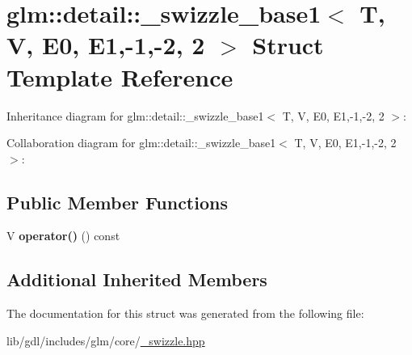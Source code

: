\hypertarget{structglm_1_1detail_1_1__swizzle__base1_3_01_t_00_01_v_00_01_e0_00_01_e1_00-1_00-2_00_012_01_4}{}\section{glm\+:\+:detail\+:\+:\+\_\+swizzle\+\_\+base1$<$ T, V, E0, E1,-\/1,-\/2, 2 $>$ Struct Template Reference}
\label{structglm_1_1detail_1_1__swizzle__base1_3_01_t_00_01_v_00_01_e0_00_01_e1_00-1_00-2_00_012_01_4}


Inheritance diagram for glm\+:\+:detail\+:\+:\+\_\+swizzle\+\_\+base1$<$ T, V, E0, E1,-\/1,-\/2, 2 $>$\+:


Collaboration diagram for glm\+:\+:detail\+:\+:\+\_\+swizzle\+\_\+base1$<$ T, V, E0, E1,-\/1,-\/2, 2 $>$\+:
\subsection*{Public Member Functions}
\begin{DoxyCompactItemize}
\item 
\hypertarget{structglm_1_1detail_1_1__swizzle__base1_3_01_t_00_01_v_00_01_e0_00_01_e1_00-1_00-2_00_012_01_4_ae62c208420fe971c7203cbea2a7b7481}{}V {\bfseries operator()} () const \label{structglm_1_1detail_1_1__swizzle__base1_3_01_t_00_01_v_00_01_e0_00_01_e1_00-1_00-2_00_012_01_4_ae62c208420fe971c7203cbea2a7b7481}

\end{DoxyCompactItemize}
\subsection*{Additional Inherited Members}


The documentation for this struct was generated from the following file\+:\begin{DoxyCompactItemize}
\item 
lib/gdl/includes/glm/core/\hyperlink{__swizzle_8hpp}{\+\_\+swizzle.\+hpp}\end{DoxyCompactItemize}
